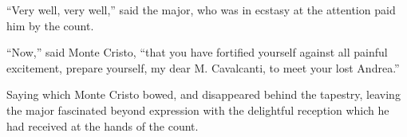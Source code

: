 “Very well, very well,” said the major, who was in ecstasy at the
attention paid him by the count.

“Now,” said Monte Cristo, “that you have fortified yourself against all
painful excitement, prepare yourself, my dear M. Cavalcanti, to meet
your lost Andrea.”

Saying which Monte Cristo bowed, and disappeared behind the tapestry,
leaving the major fascinated beyond expression with the delightful
reception which he had received at the hands of the count.
